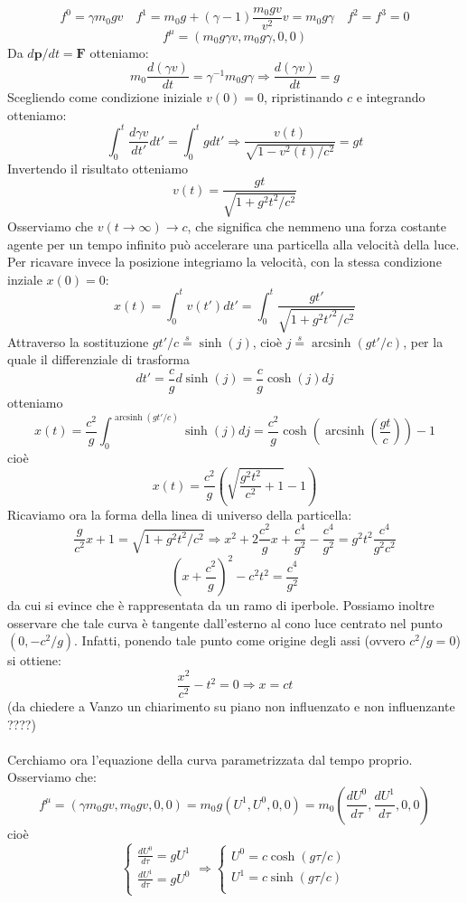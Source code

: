 \documentclass[a4paper,11pt]{book}
\theoremstyle{plain}
\theoremstyle{definition}
\DeclareMathOperator*{\arcsinh}{arcsinh}
\begin{document}
\[
f^0 = \gamma m_0gv \quad f^1=m_0g + (\gamma-1)\frac{m_0gv}{v^2}v = m_0g\gamma \quad f^2=f^3=0
\]
\[
f^{\mu} = (m_0g\gamma v, m_0g\gamma, 0, 0)
\]
Da ${d\textbf{p}}/{dt}=\textbf{F}$ otteniamo:
\[
m_0\frac{d(\gamma v)}{dt}=\gamma^{-1}m_0g\gamma \Rightarrow \frac{d(\gamma v)}{dt}=g
\]
Scegliendo come condizione iniziale $v(0)=0$, ripristinando $c$ e integrando otteniamo:
\[
\int_0^t \frac{d\gamma v}{dt'} dt' = \int_0^t g dt' \Longrightarrow \frac{v(t)}{\sqrt{1-v^2(t)/c^2}}=gt
\]
Invertendo il risultato otteniamo
\[
v(t) = \frac{gt}{\sqrt{1+g^2t^2/c^2}}
\]
Osserviamo che $v(t\to\infty)\to c$, che significa che nemmeno una forza costante agente per un tempo infinito può accelerare una particella alla velocità della luce. Per ricavare invece la posizione integriamo la velocità, con la stessa condizione inziale $x(0)=0$:
\[
x(t)=\int_0^t v(t')dt'=\int_0^t \frac{gt'}{\sqrt{1+g^2t'^2/c^2}}
\]
Attraverso la sostituzione $gt'/c\overset{s}{=}\sinh(j)$, cioè $j\overset{s}{=}\arcsinh (gt'/c)$, per la quale il differenziale di trasforma
\[
dt' = \frac{c}{g}d\sinh( j) = \frac{c}{g}\cosh( j) dj
\]
otteniamo
\[
x(t) = \frac{c^2}{g}\int_0^{\arcsinh(gt'/c)}\sinh(j)dj = \frac{c^2}{g}\cosh(\arcsinh(\frac{gt}{c}))-1
\]
cioè
\[
x(t)=\frac{c^2}{g}(\sqrt{\frac{g^2t^2}{c^2}+1}-1)
\]
Ricaviamo ora la forma della linea di universo della particella:
\[
\frac{g}{c^2}x+1=\sqrt{1+g^2t^2/c^2} \Longrightarrow x^2+2\frac{c^2}{g}x+\frac{c^4}{g^2}-\frac{c^4}{g^2}=g^2t^2\frac{c^4}{g^2c^2}
\]
\[
\left( x+\frac{c^2}{g} \right)^2-c^2t^2=\frac{c^4}{g^2}
\]
da cui si evince che è rappresentata da un ramo di iperbole. Possiamo inoltre osservare che tale curva è tangente dall'esterno al cono luce centrato nel punto $(0,-c^2/g)$. Infatti, ponendo tale punto come origine degli assi (ovvero $c^2/g=0$) si ottiene:
\[
\frac{x^2}{c^2}-t^2=0 \Rightarrow x=ct
\]
(da chiedere a Vanzo un chiarimento su piano non influenzato e non influenzante ????)
\\ \\
Cerchiamo ora l'equazione della curva parametrizzata dal tempo proprio. Osserviamo che:
\[
f^{\mu} = (\gamma m_0 gv, m_0gv,0,0) = m_0g(U^1,U^0,0,0) = m_0\left( \frac{dU^0}{d\tau},\frac{dU^1}{d\tau},0,0 \right)
\]
cioè
\[
\begin{cases}
\frac{dU^0}{d\tau}=gU^1 \\
\frac{dU^1}{d\tau}=gU^0 \\
\end{cases}
\Longrightarrow 
\begin{cases}
U^0 = c\cosh(g\tau/c) \\
U^1 = c\sinh(g\tau/c) \\
\end{cases}
\]
\end{document}
